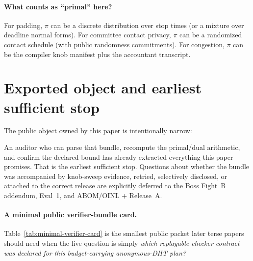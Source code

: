 \documentclass[11pt]{article}
\begin{document}
\paragraph{What counts as ``primal'' here?}
For padding, $\pi$ can be a discrete distribution over stop times (or a mixture over deadline normal forms).
For committee contact privacy, $\pi$ can be a randomized contact schedule (with public randomness commitments).
For congestion, $\pi$ can be the compiler knob manifest plus the accountant transcript.

\section{Exported object and earliest sufficient stop}
The public object owned by this paper is intentionally narrow:
\begin{center}
\end{center}
An auditor who can parse that bundle, recompute the primal/dual arithmetic, and confirm the declared bound has already extracted everything this paper promises.
That is the earliest sufficient stop.
Questions about whether the bundle was accompanied by knob-sweep evidence, retried, selectively disclosed, or attached to the correct release are explicitly deferred to the Boss Fight~B addendum, Eval~1, and ABOM/OINL + Release~A.\cite{series:bossfightBaddendum,series:evalnotary,series:abomoinl,series:releaseproperty}

\paragraph{A minimal public verifier-bundle card.}
Table~\ref{tab:minimal-verifier-card} is the smallest public packet later terse papers should need when the live question is simply \emph{which replayable checker contract was declared for this budget-carrying anonymous-DHT plan?}
\end{document}
